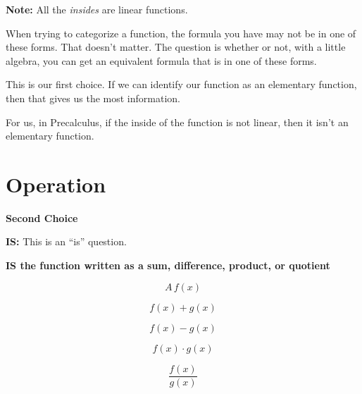 \documentclass{ximera}
\begin{document}
\textbf{Note:} All the \textit{insides} are linear functions. 


When trying to categorize a function, the formula you have may not be in one of these forms.  That doesn't matter.  The question is whether or not, with a little algebra, you can get an equivalent formula that is in one of these forms. 


This is our first choice.  If we can identify our function as an elementary function, then that gives us the most information. 


For us, in Precalculus, if the inside of the function is not linear, then it isn't an elementary function. 







































\section*{Operation}

\textbf{\textcolor{purple!85!blue}{Second Choice}} 


\textbf{\textcolor{purple!70!blue}{IS:}}   This is an ``is'' question. 

\begin{center}
\textbf{\textcolor{red!80!black}{IS the function written as a sum, difference, product, or quotient}}

\end{center}




\[
A \, f(x) 
\]


\[
f(x) + g(x)
\]


\[
f(x) - g(x)
\]


\[
f(x) \cdot g(x)
\]


\[
\frac{f(x)}{g(x)}
\]
\end{document}
